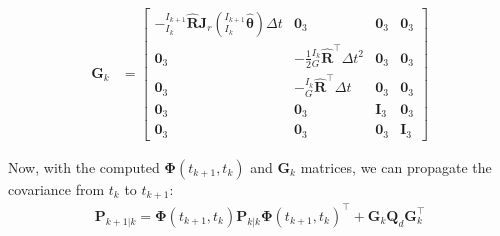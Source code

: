 \begin{align*} \mathbf{G}_{k} &= \begin{bmatrix} - \text{}^{I_{k+1}}_{I_{k}}\hat{\mathbf{R}}\mathbf J_r(\text{}^{I_{k+1}}_{I_{k}}\hat{\boldsymbol{\theta}}) \Delta t & \mathbf{0}_3 & \mathbf{0}_3 & \mathbf{0}_3 \\ \mathbf{0}_3 & - \frac{1}{2} \text{}^{I_k}_{G}\hat{\mathbf{R}}^\top \Delta t^2 & \mathbf{0}_3 & \mathbf{0}_3 \\ \mathbf{0}_3 & - \text{}^{I_k}_G\hat{\mathbf{R}}^\top \Delta t & \mathbf{0}_3 & \mathbf{0}_3 \\ \mathbf{0}_3 & \mathbf{0}_3 & \mathbf{I}_3 & \mathbf{0}_3 \\ \mathbf{0}_3 & \mathbf{0}_3 & \mathbf{0}_3 & \mathbf{I}_3 \end{bmatrix} \end{align*}

Now, with the computed $\boldsymbol{\Phi}(t_{k+1},t_k)$ and $\mathbf{G}_{k}$ matrices, we can propagate the covariance from $t_k$ to $t_{k+1}$\+: \begin{align*} \mathbf{P}_{k+1|k} = \boldsymbol{\Phi}(t_{k+1},t_k)\mathbf{P}_{k|k}\boldsymbol{\Phi}(t_{k+1},t_k)^\top + \mathbf{G}_k\mathbf{Q}_d\mathbf{G}_k^\top \end{align*} 